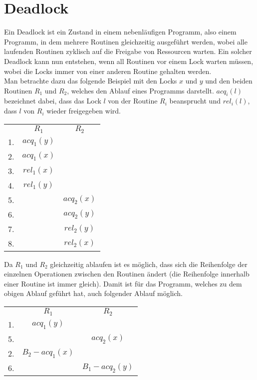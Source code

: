 \section{Deadlock} \label{Kap::Theo:Deadlocks}
Ein Deadlock ist ein Zustand in einem nebenläufigen Programm, also einem 
Programm, in dem mehrere Routinen gleichzeitig ausgeführt werden, wobei alle 
laufenden Routinen zyklisch auf die Freigabe von Ressourcen warten.
Ein solcher Deadlock kann nun entstehen, wenn all Routinen vor einem Lock warten 
müssen, wobei die Locks immer von einer anderen Routine gehalten werden.\\
Man betrachte dazu das folgende Beispiel \cite{sulzmann} mit den Locks $x$ und $y$ 
und den beiden Routinen $R_1$ und $R_2$, welches den Ablauf eines Programms 
darstellt. $acq_i(l)$ bezeichnet dabei, dass das Lock $l$ von der Routine $R_i$ 
beansprucht und $rel_i(l)$, dass $l$ von $R_i$ wieder freigegeben wird.
\begin{table}[H]
    \centering
    \begin{tabular}{ccc}
       & $R_1$        & $R_2$          \\
    1. & $acq_{1}(y)$ &                \\
    2. & $acq_{1}(x)$ &                \\
    3. & $rel_{1}(x)$ &                \\
    4. & $rel_{1}(y)$ &                \\
    5. &              & $acq_{2}(x)$ \\
    6. &              & $acq_{2}(y)$ \\
    7. &              & $rel_{2}(y)$ \\
    8. &              & $rel_{2}(x)$
    \end{tabular}
\end{table}
Da $R_1$ und $R_2$ gleichzeitig ablaufen ist es möglich, dass sich die 
Reihenfolge der einzelnen Operationen zwischen den Routinen ändert (die Reihenfolge
innerhalb einer Routine ist immer gleich). Damit ist für das Programm, welches 
zu dem obigen Ablauf geführt hat, auch folgender Ablauf möglich. 
\begin{table}[H]
    \centering
    \begin{tabular}{ccc}
       & $R_1$          & $R_2$          \\
    1. & $acq_{1}(y)$ &                \\
    5. &                & $acq_{2}(x)$ \\
    2. & $B_2-acq_{1}(x)$ &                \\
    6. &                & $B_1-acq_{2}(y)$
    \end{tabular}
\end{table}
